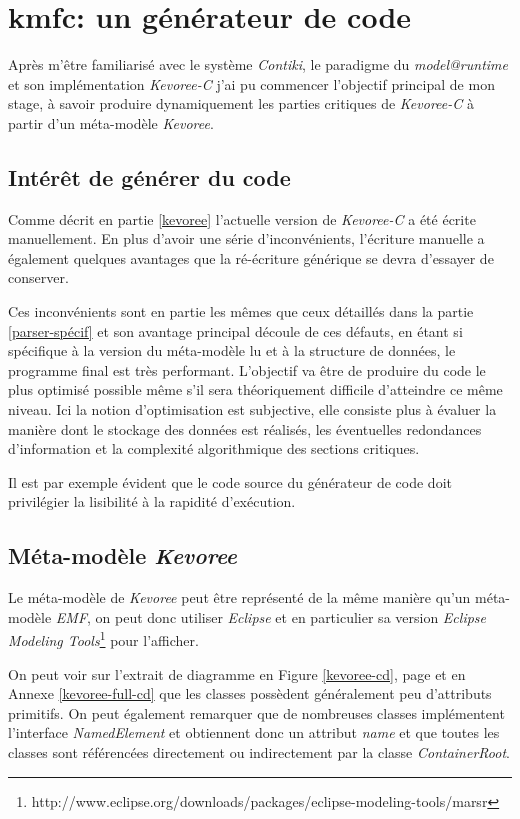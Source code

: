 \section{kmfc: un générateur de code}

Après m'être familiarisé avec le système \emph{Contiki}, le paradigme du \emph{model@runtime} et son implémentation \emph{Kevoree-C} j'ai pu commencer l'objectif principal de mon stage, à savoir produire dynamiquement les parties critiques de \emph{Kevoree-C} à partir d'un méta-modèle \emph{Kevoree}.

\subsection{Intérêt de générer du code}

Comme décrit en partie \ref{kevoree} l'actuelle version de \emph{Kevoree-C} a été écrite manuellement. En plus d'avoir une série d'inconvénients, l'écriture manuelle a également quelques avantages que la ré-écriture générique se devra d'essayer de conserver.

Ces inconvénients sont en partie les mêmes que ceux détaillés dans la partie \ref{parser-spécif} et son avantage principal découle de ces défauts, en étant si spécifique à la version du méta-modèle lu et à la structure de données, le programme final est très performant. L'objectif va être de produire du code le plus optimisé possible même s'il sera théoriquement difficile d'atteindre ce même niveau. Ici la notion d'optimisation est subjective, elle consiste plus à évaluer la manière dont le stockage des données est réalisés, les éventuelles redondances d'information et la complexité algorithmique des sections critiques.

Il est par exemple évident que le code source du générateur de code doit privilégier la lisibilité à la rapidité d'exécution.

\subsection{\label{mm-kevoree}Méta-modèle \emph{Kevoree}}

Le méta-modèle de \emph{Kevoree} peut être représenté de la même manière qu'un méta-modèle \emph{EMF}, on peut donc utiliser \emph{Eclipse}\cite{eclipse} et en particulier sa version \emph{Eclipse Modeling Tools}\footnote{http://www.eclipse.org/downloads/packages/eclipse-modeling-tools/marsr} pour l'afficher. 

On peut voir sur l'extrait de diagramme en Figure \ref{kevoree-cd}, page \pageref{kevoree-cd} et en Annexe \ref{kevoree-full-cd} que les classes possèdent généralement peu d'attributs primitifs. On peut également remarquer que de nombreuses classes implémentent l'interface \emph{NamedElement} et obtiennent donc un attribut \emph{name} et que toutes les classes sont référencées directement ou indirectement par la classe \emph{ContainerRoot}.

